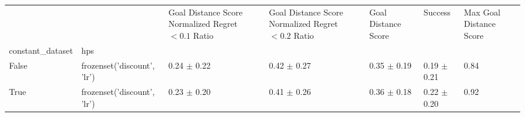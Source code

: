 \begin{tabular}{lllllll}
\toprule
 &  & Goal Distance Score Normalized Regret $< 0.1$ Ratio & Goal Distance Score Normalized Regret $< 0.2$ Ratio & Goal Distance Score & Success & Max Goal Distance Score \\
constant_dataset & hps &  &  &  &  &  \\
\midrule
False & frozenset({'discount', 'lr'}) & 0.24 $\pm$ 0.22 & 0.42 $\pm$ 0.27 & 0.35 $\pm$ 0.19 & 0.19 $\pm$ 0.21 & 0.84 \\
\cline{1-7}
True & frozenset({'discount', 'lr'}) & 0.23 $\pm$ 0.20 & 0.41 $\pm$ 0.26 & 0.36 $\pm$ 0.18 & 0.22 $\pm$ 0.20 & 0.92 \\
\cline{1-7}
\bottomrule
\end{tabular}
